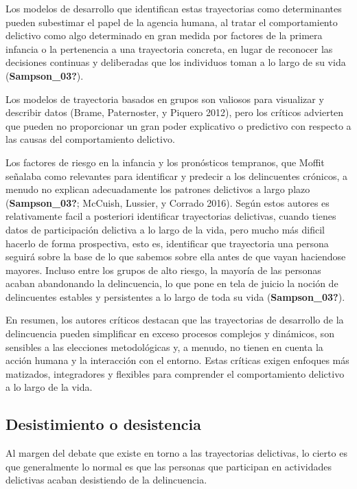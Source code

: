 \documentclass[
  spanish,
  letterpaper,
  DIV=11,
  numbers=noendperiod]{scrreprt}
\begin{document}
Los modelos de desarrollo que identifican estas trayectorias como
determinantes pueden subestimar el papel de la agencia humana, al tratar
el comportamiento delictivo como algo determinado en gran medida por
factores de la primera infancia o la pertenencia a una trayectoria
concreta, en lugar de reconocer las decisiones continuas y deliberadas
que los individuos toman a lo largo de su vida (\textbf{Sampson\_03?}).

Los modelos de trayectoria basados en grupos son valiosos para
visualizar y describir datos (Brame, Paternoster, y Piquero 2012), pero
los críticos advierten que pueden no proporcionar un gran poder
explicativo o predictivo con respecto a las causas del comportamiento
delictivo.

Los factores de riesgo en la infancia y los pronósticos tempranos, que
Moffit señalaba como relevantes para identificar y predecir a los
delincuentes crónicos, a menudo no explican adecuadamente los patrones
delictivos a largo plazo (\textbf{Sampson\_03?}; McCuish, Lussier, y
Corrado 2016). Según estos autores es relativamente facil a posteriori
identificar trayectorias delictivas, cuando tienes datos de
participación delictiva a lo largo de la vida, pero mucho más dificil
hacerlo de forma prospectiva, esto es, identificar que trayectoria una
persona seguirá sobre la base de lo que sabemos sobre ella antes de que
vayan haciendose mayores. Incluso entre los grupos de alto riesgo, la
mayoría de las personas acaban abandonando la delincuencia, lo que pone
en tela de juicio la noción de delincuentes estables y persistentes a lo
largo de toda su vida (\textbf{Sampson\_03?}).

En resumen, los autores críticos destacan que las trayectorias de
desarrollo de la delincuencia pueden simplificar en exceso procesos
complejos y dinámicos, son sensibles a las elecciones metodológicas y, a
menudo, no tienen en cuenta la acción humana y la interacción con el
entorno. Estas críticas exigen enfoques más matizados, integradores y
flexibles para comprender el comportamiento delictivo a lo largo de la
vida.

\subsection{Desistimiento o
desistencia}\label{desistimiento-o-desistencia}

Al margen del debate que existe en torno a las trayectorias delictivas,
lo cierto es que generalmente lo normal es que las personas que
participan en actividades delictivas acaban desistiendo de la
delincuencia.
\end{document}
